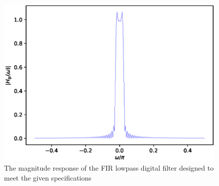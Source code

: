 \documentclass{article}
\begin{document}
\begin{figure}
\label{fig6}
\includegraphics[width = 15cm]{./figs/fir-lowpass.eps}
\caption{The magnitude response of the FIR lowpass digital filter designed to meet the given specifications} 
\end{figure}
\end{document}

